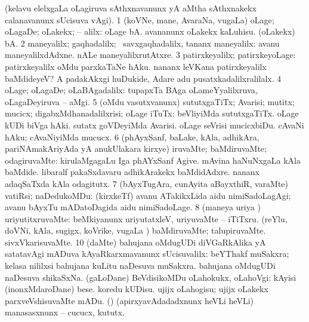 \bentry
{}
\gl{\kirxvi}
\bmng
(kelavu elelxgaLa oLagiruva sAthxnavanunx yA aMtha sAthxnakekx calanavanunx sUcisuva \kirxvi vAgi). 
\bnum
\num{1} (koVNe, mane, AvaraNa, \mo vugaLa) oLage; oLagaDe; oLakekx; -- alilx:  oLage bA.  avananunx oLakekx kaLuhisu.  (oLakekx) bA. 
\num{2} maneyalilx; gaqhadalilx; \kanmu\ savxgaqhadalilx, tananx maneyalilx:  avanu maneyalilxdAdxne.  nALe maneyalilxrutAtxre. 
\num{3} patirxkeyalilx; patirxkeyoLage:  patirxkeyalilx oMdu parxkaTaNe hAku.  nananx leVKana patirxkeyalilx baMdideyeV?  A padakAkxgi huDukide, Adare adu pusatxkadalilxralilalx. 
\num{4} oLage; oLagaDe; oLaBAgadalilx:  tupapxTa BAga oLameYyalilxruva, oLagaDeyiruva -- aMgi. 
\num{5} (oMdu vasutxvanunx) sututxgaTiTx; Avarisi; mutitx; mucicx; digabxMdhanadalilxrisi; oLage iTuTx:  beVliyiMda sututxgaTiTx.  oLage kUDi biVga hAki.  sutatx goVDeyiMda Avarisi.  oLage seVrisi mucicxbiDu.  cAvaNi hAku; cAvaNiyiMda mucucx. 
\num{6} (phAyxSanf, baLake, kAla, adhikAra, pariNAmakAriyAda yA anukUlakara kirxye) iruvaMte; baMdiruvaMte; odagiruvaMte:  kirulaMgagaLu Iga phAYxSanf Agive.  mAvina haNuNxgaLa kAla baMdide.  libaralf pakaSxdavaru adhikArakekx baMdidAdxre.  nananx adaqSaTxda kAla odagitutx. 
\num{7} (bAyxTugAra, cunAyita aBayxthiR, \mo varaMte) vatiRsi; naDedukoMDu:  (kirxkeTf) avanu ATakikxLida aidu nimiSadoLagAgi; avanu bAyxTu mADatoDagida aidu nimiSadoLage. 
\num{8} (maneya uriya \vi) uriyutitxruvaMte:  beMkiyanunx uriyutatxleV, uriyuvaMte -- iTiTxru. 
 (reYlu, doVNi, kAla, sugigx, koVrike, \mo vugaLa \vi) 
\banum
{} baMdiruvaMte; talupiruvaMte. 
 sivxVkarisuvaMte. 
\eanum
\numie
\num{10} (\uparx daMte) bahujana oMdugUDi diVGaRkAlika yA satatavAgi mADuva kAyaRkarxmavanunx sUcisuvalilx:  beYThakf muSakxra; kelasa nililxsi bahujana kuLitu naDesuva muSakxra.  bahujana oMdugUDi naDesuva shikaSxNa. 
 (\sakirx gaLoDane) BeVdisikoMDu oLahokukx, oLahoVgi:  kAyisi (inonxMdaroDane) bese.  koredu kUDisu. 
\banum
{} ujijx oLahogisu; ujijx oLakekx parxveVshisuvaMte mADu. 
 (\rUpa) (apirxyavAdadadxnunx heVLi heVLi) manasasxnunx -- cucucx, kututx. 
\eanum
\numie
\enum
\emng

